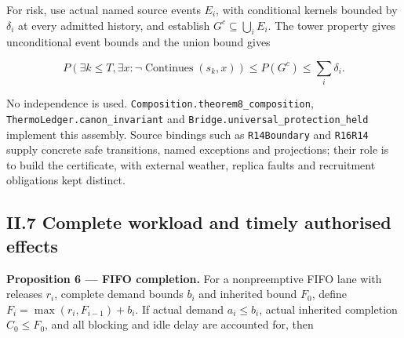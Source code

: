 \documentclass[
]{article}
\begin{document}
For risk, use actual named source events \(E_i\), with conditional
kernels bounded by \(\delta_i\) at every admitted history, and establish
\(G^c\subseteq\bigcup_i E_i\). The tower property gives unconditional
event bounds and the union bound gives

\[
P(\exists k\le T,\exists x:\neg\operatorname{Continues}(s_k,x))
\le P(G^c)\le\sum_i\delta_i.
\]

No independence is used.
\texttt{C\allowbreak{}o\allowbreak{}m\allowbreak{}p\allowbreak{}o\allowbreak{}s\allowbreak{}i\allowbreak{}t\allowbreak{}i\allowbreak{}o\allowbreak{}n\allowbreak{}.\allowbreak{}t\allowbreak{}h\allowbreak{}e\allowbreak{}o\allowbreak{}r\allowbreak{}e\allowbreak{}m\allowbreak{}8\allowbreak{}\_\allowbreak{}c\allowbreak{}o\allowbreak{}m\allowbreak{}p\allowbreak{}o\allowbreak{}s\allowbreak{}i\allowbreak{}t\allowbreak{}i\allowbreak{}o\allowbreak{}n},
\texttt{T\allowbreak{}h\allowbreak{}e\allowbreak{}r\allowbreak{}m\allowbreak{}o\allowbreak{}L\allowbreak{}e\allowbreak{}d\allowbreak{}g\allowbreak{}e\allowbreak{}r\allowbreak{}.\allowbreak{}c\allowbreak{}a\allowbreak{}n\allowbreak{}o\allowbreak{}n\allowbreak{}\_\allowbreak{}i\allowbreak{}n\allowbreak{}v\allowbreak{}a\allowbreak{}r\allowbreak{}i\allowbreak{}a\allowbreak{}n\allowbreak{}t}
and
\texttt{B\allowbreak{}r\allowbreak{}i\allowbreak{}d\allowbreak{}g\allowbreak{}e\allowbreak{}.\allowbreak{}u\allowbreak{}n\allowbreak{}i\allowbreak{}v\allowbreak{}e\allowbreak{}r\allowbreak{}s\allowbreak{}a\allowbreak{}l\allowbreak{}\_\allowbreak{}p\allowbreak{}r\allowbreak{}o\allowbreak{}t\allowbreak{}e\allowbreak{}c\allowbreak{}t\allowbreak{}i\allowbreak{}o\allowbreak{}n\allowbreak{}\_\allowbreak{}h\allowbreak{}e\allowbreak{}l\allowbreak{}d}
implement this assembly. Source bindings such as \texttt{R14Boundary}
and \texttt{R16R14} supply concrete safe transitions, named exceptions
and projections; their role is to build the certificate, with external
weather, replica faults and recruitment obligations kept distinct.

\subsection{II.7 Complete workload and timely authorised
effects}\label{ii.7-complete-workload-and-timely-authorised-effects}

\textbf{Proposition 6 --- FIFO completion.} For a nonpreemptive FIFO
lane with releases \(r_i\), complete demand bounds \(b_i\) and inherited
bound \(F_0\), define \(F_i=\max(r_i,F_{i-1})+b_i\). If actual demand
\(a_i\le b_i\), actual inherited completion \(C_0\le F_0\), and all
blocking and idle delay are accounted for, then
\end{document}
